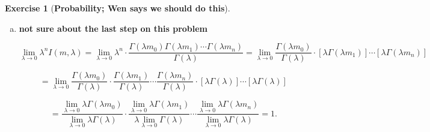 \documentclass{article}
\theoremstyle{definition}
\newtheorem{exercise}{Exercise}
\theoremstyle{definition}
\theoremstyle{definition}
\theoremstyle{definition}
\begin{document}
\begin{exercise}[\textbf{Probability; Wen says we should do this}]
\begin{enumerate}[(a)]
\[
= \frac{\Gamma(\lambda m_0) \Gamma(\lambda m_1)}{\Gamma(\lambda)}
\]

where we used the definition of the Beta function:

\[
B(z_1, z_2) := \int_0^1 t^{z_1 - 1} (1-t)^{z_2 - 1} \ dt= \frac{ \Gamma(z_1) \Gamma(z_2)}{\Gamma(z_1 + z_2)}
\]

\item \textbf{not sure about the last step on this problem}

\[
\lim_{\lambda \to 0} \lambda^n I(m, \lambda) = \lim_{\lambda \to 0} \lambda^n \cdot   \frac{\Gamma(\lambda m_0) \Gamma(\lambda m_1) \cdots \Gamma(\lambda m_n)}{\Gamma(\lambda)} = \lim_{\lambda \to 0}  \frac{ \Gamma(\lambda m_0) }{\Gamma(\lambda)} \cdot  [\lambda  \Gamma(\lambda m_1)] \cdots[ \lambda \Gamma(\lambda m_n)]
\]

\[
= \lim_{\lambda \to 0}  \frac{ \Gamma(\lambda m_0) }{\Gamma(\lambda)}\cdot \frac{\Gamma(\lambda m_1)}{\Gamma(\lambda)} \cdots \frac{\Gamma(\lambda m_n)}{\Gamma(\lambda)}  \cdot  [\lambda  \Gamma(\lambda )] \cdots[ \lambda \Gamma(\lambda )]
\]


\[
 = \frac{  \lim_{\lambda \to 0} \lambda  \Gamma(\lambda m_0) } { \lim_{\lambda \to 0}   \lambda \Gamma(\lambda)}\cdot  \frac{  \lim_{\lambda \to 0} \lambda  \Gamma(\lambda m_1)}{ \lambda \lim_{\lambda \to 0}  \Gamma(\lambda)} \cdots  \frac{   \lim_{\lambda \to 0} \lambda \Gamma(\lambda m_n)}{ \lim_{\lambda \to 0} \lambda \Gamma(\lambda)}  = 1.
\]


%


\end{enumerate}
\end{exercise}
\end{document}

